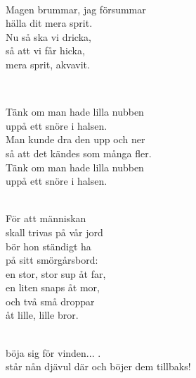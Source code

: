  \\       

\songtext{}
Magen brummar, jag försummar\\
hälla dit mera sprit.\\
Nu så ska vi dricka,\\
så att vi får hicka,\\
mera sprit, akvavit.

\newpage 


 \\       

\songtext{}
\leftrepeat Tänk om man hade lilla nubben \\
uppå ett snöre i halsen. \rightrepeat \\
Man kunde dra den upp och ner \\
så att det kändes som många fler. \\
Tänk om man hade lilla nubben \\
uppå ett snöre i halsen. \\


 \\       

\songtext{}För att människan \\
skall trivas på vår jord \\
bör hon ständigt ha \\
på sitt smörgårsbord: \\
en stor, stor sup åt far, \\
en liten snaps åt mor, \\
och två små droppar \\
åt lille, lille bror. \\


 \\       

 böja sig för vinden... .\\
står nån djävul där och böjer dem tillbaks! 
\newpage


